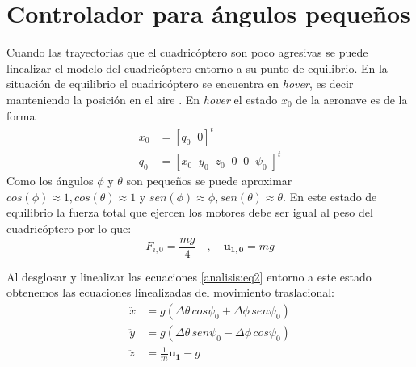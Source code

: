 \section{Controlador para ángulos pequeños}
Cuando las trayectorias que el cuadricóptero son poco agresivas se puede linealizar el modelo del cuadricóptero entorno a su punto de equilibrio. En la situación de equilibrio el cuadricóptero se encuentra en \textit{hover}, es decir manteniendo la posición en el aire . En \textit{hover} el estado $x_0$ de la aeronave es de la forma 
\begin{align}
	x_0 &= [q_0 \;\; 0]^t\nonumber\\
	q_0 &= [x_0  \;\;y_0  \;\;z_0  \;\;0  \;\;0  \;\;\psi_0  \;]^t
\end{align}
Como los ángulos $\phi$ y $\theta$ son pequeños se puede aproximar $cos(\phi) \approx 1 , cos(\theta) \approx 1$ y $sen(\phi) \approx \phi , sen(\theta) \approx \theta$. En este estado de equilibrio la fuerza total que ejercen los motores debe ser igual al peso del cuadricóptero por lo que:
\begin{equation}
	F_{i,0}  = \frac{mg}{4}\quad,\quad \mathbf{u_{1,0}} = mg
\end{equation}

Al desglosar y linealizar las ecuaciones \ref{analisis:eq2} entorno a este estado obtenemos las ecuaciones linealizadas del movimiento traslacional:
\begin{align}
	\ddot{x} &= g (\Delta\theta\, cos \psi_0 + \Delta\phi\,sen\psi_0)\nonumber \\
	\ddot{y} &= g(\Delta\theta\, sen \psi_0  - \Delta\phi\,cos\psi_0) \label{eq:control1}\\
	\ddot{z} &= \frac{1}{m}\mathbf{u_1}-g\nonumber
\end{align}

